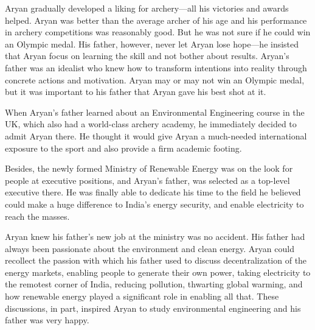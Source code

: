 Aryan gradually developed a liking for archery—all his victories and
awards helped. Aryan was better than the average archer of his age and his
performance in archery competitions was reasonably good. But he was not sure
if he could win an Olympic medal. His father, however, never let Aryan
lose hope—he insisted that Aryan focus on learning the skill and not bother
about results. Aryan's father was an idealist who knew how to transform
intentions into reality through concrete actions and motivation. Aryan may or may
not win an Olympic medal, but it was important to his father that Aryan gave his
best shot at it.

When Aryan's father learned about an Environmental Engineering course in
the UK, which also had a world-class archery academy, he immediately decided to admit
Aryan there. He thought it would give Aryan a much-needed international exposure
to the sport and also provide a firm academic footing.

Besides, the newly formed Ministry of Renewable Energy was on the look for people at
executive positions, and Aryan's father, was selected as a top-level
executive there. He was finally able to dedicate his time to the field he believed
could make a huge difference to India's energy security, and enable electricity
to reach the masses.

Aryan knew his father's new job at the ministry was no
accident. His father had always been passionate about the environment and clean
energy. Aryan could recollect the passion with which his father used to discuss decentralization of the energy markets, enabling people to generate
their own power, taking electricity to the remotest corner of India, reducing
pollution, thwarting global warming, and how renewable energy played a
significant role in enabling all that. These discussions, in part, inspired
Aryan to study environmental engineering and his father was very happy.